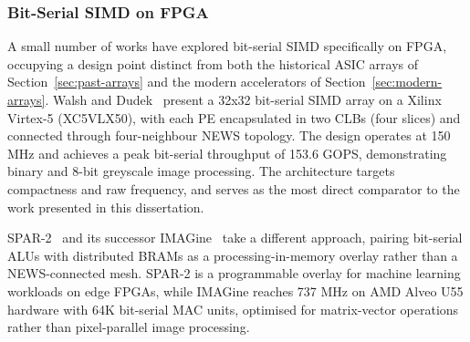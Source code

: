         \subsubsection{Bit-Serial SIMD on FPGA}
        \label{sec:bitserial-fpga}
            A small number of works have explored bit-serial SIMD specifically on FPGA, occupying a design point distinct from both the historical ASIC arrays of Section~\ref{sec:past-arrays} and the modern accelerators of Section~\ref{sec:modern-arrays}.
            Walsh and Dudek~\cite{ref:walsh2012} present a 32x32 bit-serial SIMD array on a Xilinx Virtex-5 (XC5VLX50), with each PE encapsulated in two CLBs (four slices) and connected through four-neighbour NEWS topology. The design operates at 150 MHz and achieves a peak bit-serial throughput of 153.6 GOPS, demonstrating binary and 8-bit greyscale image processing. The architecture targets compactness and raw frequency, and serves as the most direct comparator to the work presented in this dissertation.
            
            SPAR-2~\cite{ref:spar2} and its successor IMAGine~\cite{ref:imagine} take a different approach, pairing bit-serial ALUs with distributed BRAMs as a processing-in-memory overlay rather than a NEWS-connected mesh. SPAR-2 is a programmable overlay for machine learning workloads on edge FPGAs, while IMAGine reaches 737 MHz on AMD Alveo U55 hardware with 64K bit-serial MAC units, optimised for matrix-vector operations rather than pixel-parallel image processing.

